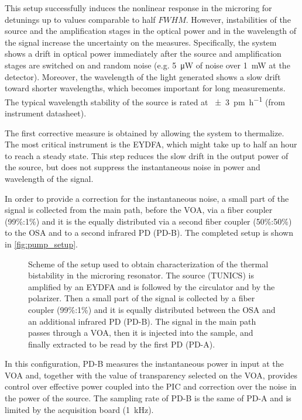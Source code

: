 This setup successfully induces the nonlinear response in the microring for detunings up to values comparable to half $FWHM$.
However, instabilities of the source and the amplification stages in the optical power and in the wavelength of the signal increase the uncertainty on the measures.
Specifically, the system shows a drift in optical power immediately after the source and amplification stages are switched on and random noise (e.g. \SI{5}{\uW} of noise over \SI{1}{\mW} at the detector).
Moreover, the wavelength of the light generated shows a slow drift toward shorter wavelengths, which becomes important for long measurements.
The typical wavelength stability of the source is rated at \SI[per-mode=symbol]{+-3}{\pico\meter\per\hour} (from instrument datasheet).

The first corrective measure is obtained by allowing the system to thermalize.
The most critical instrument is the \ac{EYDFA}, which might take up to half an hour to reach a steady state.
This step reduces the slow drift in the output power of the source, but does not suppress the instantaneous noise in power and wavelength of the signal.

In order to provide a correction for the instantaneous noise, a small part of the signal is collected from the main path, before the VOA, via a fiber coupler (99\%:1\%) and it is the equally distributed via a second fiber coupler (50\%:50\%) to the OSA and to a second infrared \ac{PD} (PD-B).
The completed setup is shown in \autoref{fig:pump_setup}.

\begin{figure}[hbtp]
	\centering
	
	\caption{Scheme of the setup used to obtain characterization of the thermal bistability in the microring resonator.
		The source (TUNICS) is amplified by an \acs{EYDFA} and is followed by the circulator and by the polarizer.
		Then a small part of the signal is collected by a fiber coupler (99\%:1\%) and it is equally distributed between the OSA and an additional infrared \ac{PD} (PD-B).
		The signal in the main path passes through a \acf{VOA}, then it is injected into the sample, and finally extracted to be read by the first \ac{PD} (PD-A).
		}
	\label{fig:pump_setup}
\end{figure}

In this configuration, PD-B measures the instantaneous power in input at the VOA and, together with the value of transparency selected on the VOA, provides control over effective power coupled into the \ac{PIC} and correction over the noise in the power of the source.
The sampling rate of PD-B is the same of PD-A and is limited by the acquisition board (\SI{1}{\kHz}).

